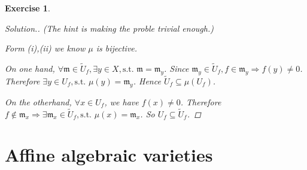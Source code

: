\documentclass{article}
\theoremstyle{breakstyle}
\newtheorem{exercise}{Exercise}
\newenvironment{solution}
  {\begin{proof}[Solution.]\renewcommand{\qedsymbol}{}}
  {\end{proof}}
\begin{document}
\begin{exercise}
\begin{solution}
    \emph{(The hint is making the proble trivial enough.)}

        Form \emph{(i),(ii)} we know $\mu$ is bijective.

        On one hand, $\forall \mathfrak{m}\in \tilde{U}_{f},\exists y\in X,\text{s.t. }\mathfrak{m}=\mathfrak{m}_{y}$.
        Since $\mathfrak{m}_{y}\in \tilde{U}_{f},f\in \mathfrak{m}_{y}\Rightarrow f(y)\neq 0$.
        Therefore $\exists y\in U_{f},\text{s.t. }\mu(y)=\mathfrak{m}_{y}$.
        Hence $\tilde{U}_{f}\subseteq \mu(U_{f})$.

        On the otherhand, $\forall x\in U_{f}$,
        we have $f(x)\neq 0$.
        Therefore $f\not\in \mathfrak{m}_{x}\Rightarrow\exists \mathfrak{m}_{x}\in \tilde{U}_{f},\text{s.t. }\mu(x)=\mathfrak{m}_{x}$.
        So $U_{f}\subseteq \tilde{U}_{f}$.
\end{solution}
\end{exercise}

\section*{Affine algebraic varieties}
\end{document}
